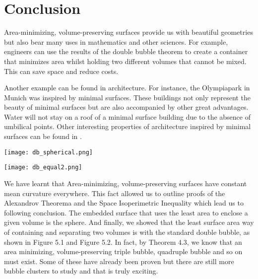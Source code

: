 \documentclass[a4paper,12pt]{report}
\begin{document}
\chapter{Conclusion}

Area-minimizing, volume-preserving surfaces provide us with beautiful geometries but also bear many uses in mathematics and other sciences. For example, engineers can use the results of the double bubble theorem to create a container that minimizes area whilst holding two different volumes that cannot be mixed. This can save space and reduce costs.\par 
\hspace{-0.66cm}Another example can be found in architecture. For instance, the Olympiapark in Munich was inspired by minimal surfaces. These buildings not only represent the beauty of minimal surfaces but are also accompanied by other great advantages. Water will not stay on a roof of a minimal surface building due to the absence of umbilical points. Other interesting properties of architecture inspired by minimal surfaces can be found in \cite{architecture}.

\begin{center}
\texttt{[image: db\_spherical.png]}
\end{center}

\begin{center}
\texttt{[image: db\_equal2.png]}
\end{center}

\hspace{-0.66cm}We have learnt that Area-minimizing, volume-preserving surfaces have constant mean curvature everywhere. This fact allowed us to outline proofs of the Alexandrov Theorema and the Space Isoperimetric Inequality which lead us to following conclusion. The embedded surface that uses the least area to enclose a given volume is the sphere. And finally, we showed that the least surface area way of containing and separating two volumes is with the standard double bubble, as shown in Figure 5.1 and Figure 5.2. In fact, by Theorem 4.3, we know that an area minimizing, volume-preserving triple bubble, quadruple bubble and so on must exist. Some of these have already been proven but there are still more bubble clusters to study and that is truly exciting.
\end{document}
